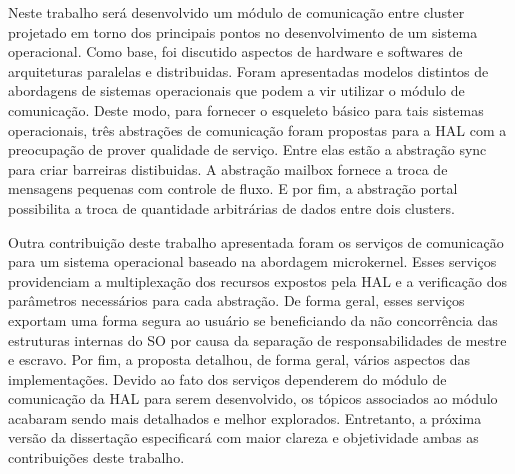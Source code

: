 Neste trabalho será desenvolvido um módulo de comunicação entre cluster
projetado em torno dos principais pontos no desenvolvimento de um
sistema operacional.
Como base, foi discutido aspectos de hardware e softwares
de arquiteturas paralelas e distribuidas.
Foram apresentadas modelos distintos de abordagens de sistemas operacionais
que podem a vir utilizar o módulo de comunicação.
Deste modo, para fornecer o esqueleto básico para tais sistemas operacionais,
três abstrações de comunicação foram propostas para a HAL com a preocupação
de prover qualidade de serviço.
Entre elas estão a abstração sync para criar barreiras distibuidas.
A abstração mailbox fornece a troca de mensagens pequenas com controle 
de fluxo.
E por fim, a abstração portal possibilita a troca de quantidade arbitrárias
de dados entre dois clusters.

Outra contribuição deste trabalho apresentada foram os 
serviços de comunicação para um sistema operacional baseado na abordagem microkernel.
Esses serviços providenciam a multiplexação dos recursos expostos pela HAL
e a verificação dos parâmetros necessários para cada abstração.
De forma geral, esses serviços exportam uma forma segura ao usuário
se beneficiando da não concorrência das estruturas internas do SO 
por causa da separação de responsabilidades de mestre e escravo.
Por fim, a proposta detalhou, de forma geral, vários aspectos
das implementações.
Devido ao fato dos serviços dependerem do módulo de comunicação da HAL
para serem desenvolvido, os tópicos associados ao módulo acabaram sendo
mais detalhados e melhor explorados.
Entretanto, a próxima versão da dissertação especificará com maior clareza
e objetividade ambas as contribuições deste trabalho.
